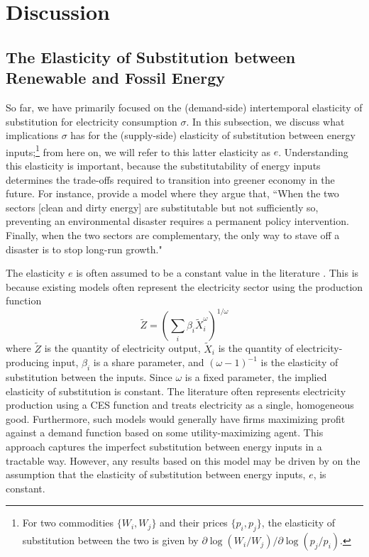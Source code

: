 \documentclass[11pt,a4paper,leqno]{extarticle}
\begin{document}
	
	
	
	\clearpage
	\section{Discussion}
	\label{sec:Discussion}
	
	\subsection{The Elasticity of Substitution between Renewable and Fossil Energy}
	
	So far, we have primarily focused on the (demand-side) intertemporal elasticity of substitution for electricity consumption $\sigma$. In this subsection, we discuss what implications $\sigma$ has for the (supply-side) elasticity of substitution between energy inputs;\footnote{
	For two commodities $\{W_i, W_j\}$ and their prices $\{p_i, p_j\}$, the elasticity of substitution between the two is given by $\partial \log (W_i/ W_j) / \partial \log (p_j/p_i)$. 
	}  from here on, we will refer to this latter elasticity as $e$. Understanding this elasticity is important, because the substitutability of energy inputs determines the trade-offs required to transition into greener economy in the future. For instance, \citet{Ace2012} provide a model where they argue that, ``When the two	sectors [clean and dirty energy] are substitutable but not sufficiently so, preventing an environmental disaster requires a permanent policy intervention. Finally, when the two sectors are complementary, the only way to stave off a disaster is to stop long-run growth."

	The elasticity $e$ is often assumed to be a constant value in the literature \citep{Pap}. This is because existing models often represent the electricity sector using the production function
	\begin{equation}
	\tilde{Z} = \left( \sum_i \beta_i \tilde{X}_i^\omega \right)^{1/\omega}
	\end{equation} 
	where   $\tilde{Z}$ is the quantity of electricity output, $\tilde{X}_i$ is the quantity of electricity-producing input, $\beta_i$ is a share parameter, and $(\omega-1)^{-1} $ is the elasticity of substitution between the inputs. Since $\omega$ is a fixed parameter, the implied elasticity of substitution is constant. The literature often represents electricity production using a CES function and treats electricity as a single, homogeneous good. Furthermore, such models would generally have firms maximizing profit against a  demand function based on some utility-maximizing agent. This approach captures the imperfect substitution between energy inputs in a tractable way. However, any results based on this model may be driven by on the assumption that the  elasticity of substitution between energy inputs, $e$, is constant. 
	
\end{document}
